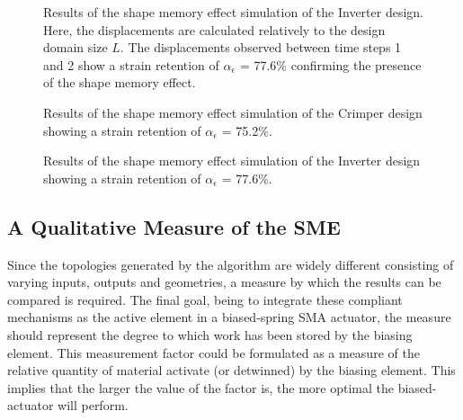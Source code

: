 \begin{figure}[hbt!]
    \centering
    
    \caption{Results of the shape memory effect simulation of the Inverter design. Here, the displacements are calculated relatively to the design domain size $L$. The displacements observed between time steps 1 and 2 show a strain retention of $\alpha_\epsilon$ = 77.6\% confirming the presence of the shape memory effect.}
    \label{fig:InverterAnsysSimu}
\end{figure}

\begin{figure}[hbt!]
    \centering
    
    \caption{Results of the shape memory effect simulation of the Crimper design showing a strain retention of $\alpha_\epsilon$ = 75.2\%.}
    \label{fig:CrimperAnsysSimu}
\end{figure}

\begin{figure}[hbt!]
    \centering
    
    \caption{Results of the shape memory effect simulation of the Inverter design showing a strain retention of $\alpha_\epsilon$ = 77.6\%.}
    \label{fig:GripperAnsysSimu}
\end{figure}

\subsection{A Qualitative Measure of the SME}
Since the topologies generated by the algorithm are widely different consisting of varying inputs, outputs and geometries, a measure by which the results can be compared is required. The final goal, being to integrate these compliant mechanisms as the active element in a biased-spring SMA actuator, the measure should represent the degree to which work has been stored by the biasing element. This measurement factor could be formulated as a measure of the relative quantity of material activate (or detwinned) by the biasing element. This implies that the larger the value of the factor is, the more optimal the biased-actuator will perform.

